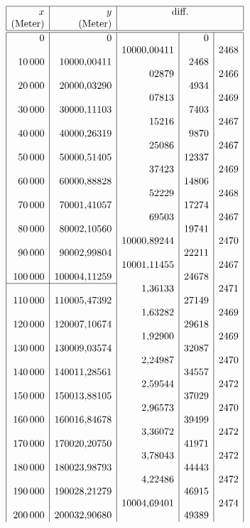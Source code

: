 {\small\renewcommand{\arraystretch}{.60}
\[\begin{array}{|r|r|r|r|r|}\hline
x&y&\multicolumn{3}{c|}{\text{diff.}}\\
\text{(Meter)}&\text{(Meter)}&\multicolumn{3}{c|}{}\\\hline\hline
0&0&&0&\\
&&10000{,}00411&&2468\\
10\,000&10000{,}00411&&2468&\\
&&02879&&2466\\
20\,000&20000{,}03290&&4934&\\
&&07813&&2469\\
30\,000&30000{,}11103&&7403&\\
&&15216&&2467\\
40\,000&40000{,}26319&&9870&\\
&&25086&&2467\\
50\,000&50000{,}51405&&12337&\\
&&37423&&2469\\
60\,000&60000{,}88828&&14806&\\
&&52229&&2468\\
70\,000&70001{,}41057&&17274&\\
&&69503&&2467\\
80\,000&80002{,}10560&&19741&\\
&&10000{,}89244&&2470\\
90\,000&90002{,}99804&&22211&\\
&&10001{,}11455&&2467\\
100\,000&100004{,}11259&&24678&\\
\cline{1-2}
&&1{,}36133&&2471\\
110\,000&110005{,}47392&&27149&\\
&&1{,}63282&&2469\\
120\,000&120007{,}10674&&29618&\\
&&1{,}92900&&2469\\
130\,000&130009{,}03574&&32087&\\
&&2{,}24987&&2470\\
140\,000&140011{,}28561&&34557&\\
&&2{,}59544&&2472\\
150\,000&150013{,}88105&&37029&\\
&&2{,}96573&&2470\\
160\,000&160016{,}84678&&39499&\\
&&3{,}36072&&2472\\
170\,000&170020{,}20750&&41971&\\
&&3{,}78043&&2472\\
180\,000&180023{,}98793&&44443&\\
&&4{,}22486&&2472\\
190\,000&190028{,}21279&&46915&\\
&&10004{,}69401&&2474\\
200\,000&200032{,}90680&&49389&\\
\end{array}\]
}


